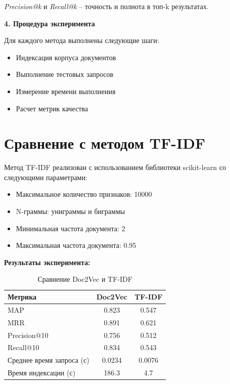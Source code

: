 \textit{Precision@k} и \textit{Recall@k} – точность и полнота в топ-k результатах.

\textbf{4. Процедура эксперимента}

Для каждого метода выполнены следующие шаги:
\begin{itemize}
	\item Индексация корпуса документов
	\item Выполнение тестовых запросов
	\item Измерение времени выполнения
	\item Расчет метрик качества
\end{itemize}

\section{Сравнение с методом TF-IDF}

Метод TF-IDF реализован с использованием библиотеки scikit-learn со следующими параметрами:
\begin{itemize}
	\item Максимальное количество признаков: 10000
	\item N-граммы: униграммы и биграммы
	\item Минимальная частота документа: 2
	\item Максимальная частота документа: 0.95
\end{itemize}

\textbf{Результаты эксперимента:}

\begin{table}[H]
	\caption{Сравнение Doc2Vec и TF-IDF}
	\begin{center}
		\begin{tabular}{|l|c|c|}
			\hline
			\textbf{Метрика} & \textbf{Doc2Vec} & \textbf{TF-IDF} \\
			\hline
			MAP & 0.823 & 0.547 \\
			\hline
			MRR & 0.891 & 0.621 \\
			\hline
			Precision@10 & 0.756 & 0.512 \\
			\hline
			Recall@10 & 0.834 & 0.543 \\
			\hline
			Среднее время запроса (с) & 0.0234 & 0.0076 \\
			\hline
			Время индексации (с) & 186.3 & 4.7 \\
			\hline
		\end{tabular}
	\end{center}
\end{table}

